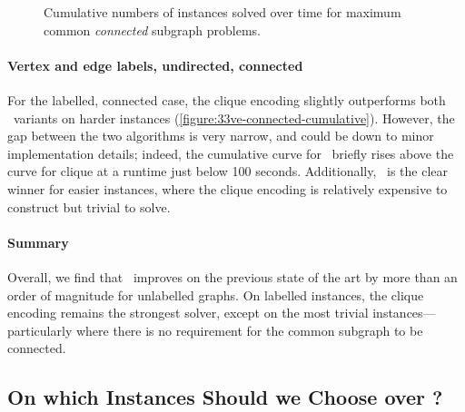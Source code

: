 \begin{figure}[h!]
    \centering
    \par\bigskip
    \caption{Cumulative numbers of instances solved over time for maximum
    common \emph{connected} subgraph problems.}\label{figure:mcs-cumulative-connected}
\end{figure}






\paragraph{Vertex and edge labels, undirected, connected} For the labelled,
connected case, the clique encoding slightly outperforms both \McSplit\
variants on harder instances (\cref{figure:33ve-connected-cumulative}).
However, the gap between the two algorithms is very narrow, and could be
down to minor implementation details; indeed, the cumulative curve for
\McSplit\ briefly rises above the curve for clique at a runtime just below 100
seconds. Additionally, \McSplit\ is the clear winner for easier instances,
where the clique encoding is relatively expensive to construct but trivial to
solve.






\paragraph{Summary} Overall, we find that \McSplit\ improves on the
previous state of the art by more than an order of magnitude for
unlabelled graphs.  On labelled instances, the clique encoding remains the
strongest solver, except on the most trivial instances---particularly where
there is no requirement for the common subgraph to be connected.







\subsection{On which Instances Should we Choose \McSplit{$\downarrow$}
    over \McSplit?}\label{sec:which-mcsplit-down}

